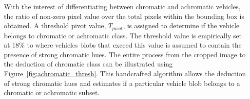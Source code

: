 With the interest of differentiating between chromatic and achromatic vehicles, the ratio of non-zero pixel value over the total pixels within the bounding box is obtained.
A threshold pivot value, $T_{pivot}$, is assigned to determine if the vehicle belongs to chromatic or achromatic class.
The threshold value is empirically set at 18\% to where vehicles blobs that exceed this value is assumed to contain the presence of strong chromatic hues.
The entire process from the cropped image to the deduction of chromatic class can be illustrated using Figure~\ref{fig:achromatic_thresh}. This handcrafted algorithm allows the deduction of strong chromatic hues and estimates if a particular vehicle blob belongs to a chromatic or achromatic subset.


